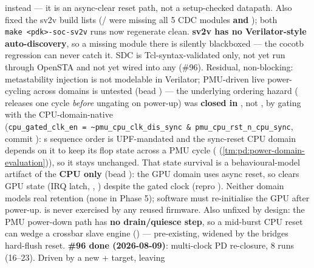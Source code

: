 \begin{record}
\begin{enumerate}
   instead --- it is an async-clear reset path, not
  a setup-checked datapath. Also fixed the sv2v build lists
  (/ were missing all 5 CDC
  modules \textbf{and} ); both
  \texttt{make\ <pdk>-\allowbreak{}soc-\allowbreak{}sv2v} runs now
  regenerate clean. \warn{} \textbf{sv2v has no Verilator-style
   auto-discovery}, so a missing module there is silently
  blackboxed --- the cocotb regression can never catch it. SDC is
  Tcl-syntax-validated only, not yet run through OpenSTA and not yet
  wired into any  (\#96). Residual, non-blocking:
  metastability injection is not modelable in Verilator; PMU-driven live
  power-cycling across domains is untested (bead ) --- the
  underlying ordering hazard ( releases  one
  cycle \emph{before} ungating  on power-up) was
  \textbf{closed in }, not , by gating
   with the CPU-domain-native
  (\texttt{cpu\_\allowbreak{}gated\_\allowbreak{}clk\_\allowbreak{}en\ =\allowbreak{}\ \textasciitilde{}pmu\_\allowbreak{}cpu\_\allowbreak{}clk\_\allowbreak{}dis\_\allowbreak{}sync\ \&\ pmu\_\allowbreak{}cpu\_\allowbreak{}rst\_\allowbreak{}n\_\allowbreak{}cpu\_\allowbreak{}sync},
  commit ): \textquotesingle s sequence order
  is UPF-mandated and the sync-reset CPU domain depends on it to keep
  its flop state across a PMU cycle
  ( (\cref{tm:pd:power-domain-evaluation})), so it stays unchanged.
  \warn{} That state survival is a behavioural-model artifact of the
  \textbf{CPU only} (bead ): the GPU domain uses async reset,
  so  clears GPU state (IRQ latch,
  , ) despite the gated clock (repro
  ).
  Neither domain models real retention (none in Phase 5); software must
  re-initialise the GPU after power-up.  is never
  exercised by any reused firmware. Also unfixed by design: the PMU
  power-down path has \textbf{no drain/\allowbreak{}quiesce step}, so a
  mid-burst CPU reset can wedge a crossbar slave engine
  () --- pre-existing, widened by the
  bridge\textquotesingle s hard-flush reset. \textbf{\#96 done
  (2026-08-09)}: multi-clock PD re-closure, 8 runs (16--23). Driven by a
  new  +
   target, leaving

\end{enumerate}
\end{record}
